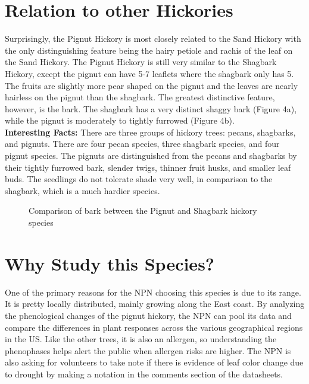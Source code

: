 \documentclass{article}\usepackage[]{graphicx}\usepackage[]{color}
\begin{document}
\section*{Relation to other Hickories}
Surprisingly, the Pignut Hickory is most closely related to the Sand Hickory with the only distinguishing feature being the hairy petiole and rachis of the leaf on the Sand Hickory. The Pignut Hickory is still very similar to the Shagbark Hickory, except the pignut can have 5-7 leaflets where the shagbark only has 5. The fruits are slightly more pear shaped on the pignut and the leaves are nearly hairless on the pignut than the shagbark. The greatest distinctive feature, however, is the bark. The shagbark has a very distinct shaggy bark (Figure 4a), while the pignut is moderately to tightly furrowed (Figure 4b). 
\\
{\textbf{Interesting Facts:}}
There are three groups of hickory trees: pecans, shagbarks, and pignuts. There are four pecan species, three shagbark species, and four pignut species. The pignuts are distinguished from the pecans and shagbarks by their tightly furrowed bark, slender twigs, thinner fruit husks, and smaller leaf buds. The seedlings do not tolerate shade very well, in comparison to the shagbark, which is a much hardier species. 
\begin{figure}[ht]%
    \centering
    \qquad
    \caption{Comparison of bark between the Pignut and Shagbark hickory species}%
    \label{fig:bark}%
\end{figure}
\newpage
\section*{Why Study this Species?}
One of the primary reasons for the NPN choosing this species is due to its range. It is pretty locally distributed, mainly growing along the East coast. By analyzing the phenological changes of the pignut hickory, the NPN can pool its data and compare the differences in plant responses across the various geographical regions in the US. Like the other trees, it is also an allergen, so understanding the phenophases helps alert the public when allergen risks are higher. The NPN is also asking for volunteers to take note if there is evidence of leaf color change due to drought by making a notation in the comments section of the datasheets. 
\newpage
\end{document}
